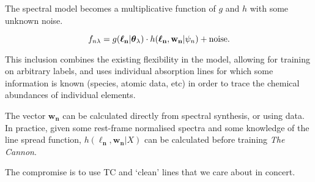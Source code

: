 \documentclass[useAMS,usenatbib]{mn2e}
\newcommand\tc{\textit{The Cannon}}
\newcommand\lv{\mathbf{\boldsymbol\ell_n}}
\newcommand\cv{{\boldsymbol\theta}_\lambda}
\newcommand\wv{\mathbf{w_n}}
\newcommand\given{|}
\begin{document}
The spectral model becomes a multiplicative function of $g$ and $h$ with some
unknown noise.

\begin{equation}
    f_{n\lambda} = g(\lv\given\cv) \cdot h(\lv,\wv\given\psi_n) +  {\rm noise}.
\end{equation}

This inclusion combines the existing flexibility in the model, allowing for training on arbitrary labels, and uses individual absorption lines for which some information is known (species, atomic data, etc) in order to trace the chemical abundances of individual elements.


The vector $\wv$ can be calculated directly from spectral synthesis, or using data.
In practice, given some rest-frame normalised spectra and some knowledge of the
line spread function, $h(\lv,\wv\given{}X)$ can be calculated before training \tc.








The compromise is to use TC and `clean' lines that we care about in concert.




\end{document}
